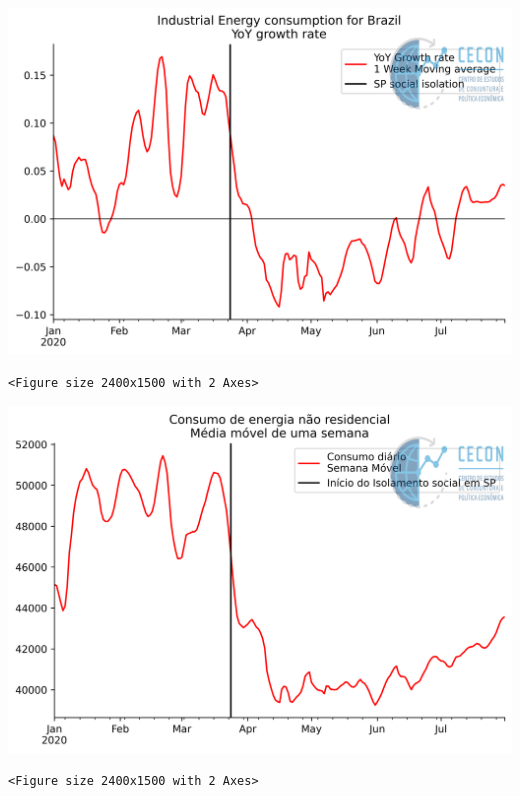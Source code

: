 \documentclass[11pt]{article}
\begin{document}
\begin{enumerate}
\begin{center}
\includegraphics[width=.9\linewidth]{obipy-resources/62e383af79e91b63c7fc98dd7fb55b3c3ececcb9/f9ca7a33a86e705f7a59435db0037a8fc525f9eb.png}
\end{center}

\begin{verbatim}
<Figure size 2400x1500 with 2 Axes>
\end{verbatim}


\begin{center}
\includegraphics[width=.9\linewidth]{obipy-resources/62e383af79e91b63c7fc98dd7fb55b3c3ececcb9/3f4b22b7fe301e9d040661b4ccbfccd82d0f77ff.png}
\end{center}

\begin{verbatim}
<Figure size 2400x1500 with 2 Axes>
\end{verbatim}



\end{enumerate}
\end{document}
